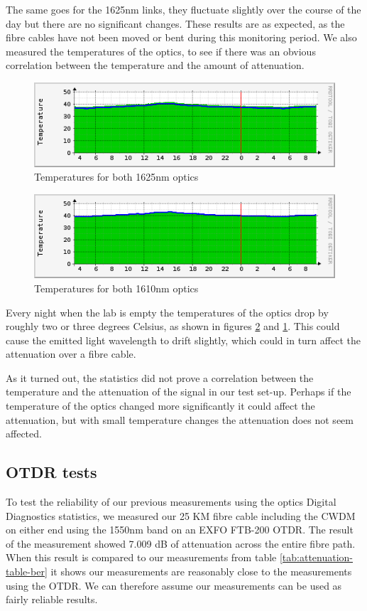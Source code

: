 \documentclass{article}
\begin{document}
The same goes for the 1625nm links, they fluctuate slightly over the course of the day but there are no significant changes.
These results are as expected, as the fibre cables have not been moved or bent during this monitoring period.
We also measured the temperatures of the optics, to see if there was an obvious correlation between the temperature and the amount of attenuation.
\begin{figure}[h!]
\centerline{\includegraphics[scale=0.7]{images/temp1625.png}}
\caption{Temperatures for both 1625nm optics}
\label{fig:temp1625}
\end{figure}
\begin{figure}[h!]
\centerline{\includegraphics[scale=0.7]{images/temp1610.png}}
\caption{Temperatures for both 1610nm optics}
\label{fig:temp1610}
\end{figure}
Every night when the lab is empty the temperatures of the optics drop by roughly two or three degrees Celsius, as shown in figures \ref{fig:temp1610} and \ref{fig:temp1625}.
This could cause the emitted light wavelength to drift slightly, which could in turn affect the attenuation over a fibre cable.

As it turned out, the statistics did not prove a correlation between the temperature and the attenuation of the signal in our test set-up.
Perhaps if the temperature of the optics changed more significantly it could affect the attenuation, but with small temperature changes the attenuation does not seem affected.

\subsection{OTDR tests}
To test the reliability of our previous measurements using the optics Digital Diagnostics statistics, we measured our 25 KM fibre cable including the CWDM on either end using the 1550nm band on an EXFO FTB-200 OTDR.
The result of the measurement showed 7.009 dB of attenuation across the entire fibre path.
When this result is compared to our measurements from table \ref{tab:attenuation-table-ber} it shows our measurements are reasonably close to the measurements using the OTDR.
We can therefore assume our measurements can be used as fairly reliable results.
\end{document}
